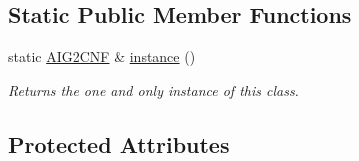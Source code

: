 \subsection*{Static Public Member Functions}
\begin{DoxyCompactItemize}
\item 
static \hyperlink{classAIG2CNF}{A\-I\-G2\-C\-N\-F} \& \hyperlink{classAIG2CNF_a7a4db833018cb851ab608004b4e651e4}{instance} ()
\begin{DoxyCompactList}\small\item\em Returns the one and only instance of this class. \end{DoxyCompactList}\end{DoxyCompactItemize}
\subsection*{Protected Attributes}
